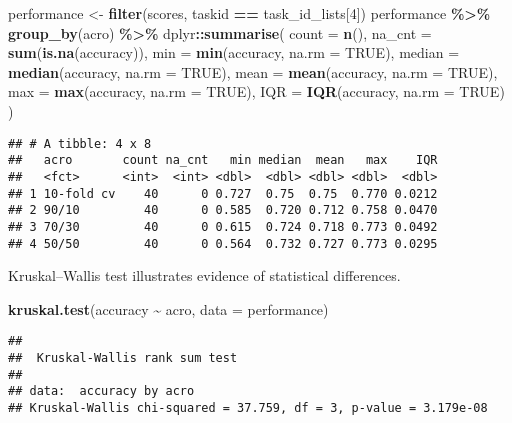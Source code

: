 \documentclass[
]{book}
\newenvironment{Shaded}{\begin{snugshade}}{\end{snugshade}}
\newcommand{\AttributeTok}[1]{\textcolor[rgb]{0.13,0.29,0.53}{#1}}
\newcommand{\ConstantTok}[1]{\textcolor[rgb]{0.56,0.35,0.01}{#1}}
\newcommand{\DecValTok}[1]{\textcolor[rgb]{0.00,0.00,0.81}{#1}}
\newcommand{\FunctionTok}[1]{\textcolor[rgb]{0.13,0.29,0.53}{\textbf{#1}}}
\newcommand{\NormalTok}[1]{#1}
\newcommand{\OtherTok}[1]{\textcolor[rgb]{0.56,0.35,0.01}{#1}}
\newcommand{\SpecialCharTok}[1]{\textcolor[rgb]{0.81,0.36,0.00}{\textbf{#1}}}
\begin{document}
\begin{Shaded}
\begin{Highlighting}[]
\NormalTok{performance }\OtherTok{\textless{}{-}} \FunctionTok{filter}\NormalTok{(scores, taskid }\SpecialCharTok{==}\NormalTok{ task\_id\_lists[}\DecValTok{4}\NormalTok{])}
\NormalTok{performance }\SpecialCharTok{\%\textgreater{}\%}
  \FunctionTok{group\_by}\NormalTok{(acro) }\SpecialCharTok{\%\textgreater{}\%}
\NormalTok{  dplyr}\SpecialCharTok{::}\FunctionTok{summarise}\NormalTok{(}
    \AttributeTok{count =} \FunctionTok{n}\NormalTok{(),}
    \AttributeTok{na\_cnt =} \FunctionTok{sum}\NormalTok{(}\FunctionTok{is.na}\NormalTok{(accuracy)),}
    \AttributeTok{min =} \FunctionTok{min}\NormalTok{(accuracy, }\AttributeTok{na.rm =} \ConstantTok{TRUE}\NormalTok{),}
    \AttributeTok{median =} \FunctionTok{median}\NormalTok{(accuracy, }\AttributeTok{na.rm =} \ConstantTok{TRUE}\NormalTok{),}
    \AttributeTok{mean =} \FunctionTok{mean}\NormalTok{(accuracy, }\AttributeTok{na.rm =} \ConstantTok{TRUE}\NormalTok{),}
    \AttributeTok{max =} \FunctionTok{max}\NormalTok{(accuracy, }\AttributeTok{na.rm =} \ConstantTok{TRUE}\NormalTok{),}
    \AttributeTok{IQR =} \FunctionTok{IQR}\NormalTok{(accuracy, }\AttributeTok{na.rm =} \ConstantTok{TRUE}\NormalTok{)}
\NormalTok{  )}
\end{Highlighting}
\end{Shaded}

\begin{verbatim}
## # A tibble: 4 x 8
##   acro       count na_cnt   min median  mean   max    IQR
##   <fct>      <int>  <int> <dbl>  <dbl> <dbl> <dbl>  <dbl>
## 1 10-fold cv    40      0 0.727  0.75  0.75  0.770 0.0212
## 2 90/10         40      0 0.585  0.720 0.712 0.758 0.0470
## 3 70/30         40      0 0.615  0.724 0.718 0.773 0.0492
## 4 50/50         40      0 0.564  0.732 0.727 0.773 0.0295
\end{verbatim}

Kruskal--Wallis test illustrates evidence of statistical differences.

\begin{Shaded}
\begin{Highlighting}[]
\FunctionTok{kruskal.test}\NormalTok{(accuracy }\SpecialCharTok{\textasciitilde{}}\NormalTok{ acro, }\AttributeTok{data =}\NormalTok{ performance)}
\end{Highlighting}
\end{Shaded}

\begin{verbatim}
## 
##  Kruskal-Wallis rank sum test
## 
## data:  accuracy by acro
## Kruskal-Wallis chi-squared = 37.759, df = 3, p-value = 3.179e-08
\end{verbatim}
\end{document}
